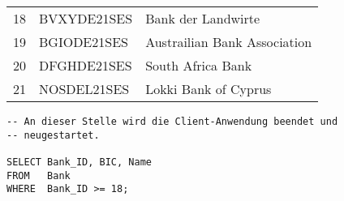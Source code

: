           \begin{center}
            \begin{small}
              \tablehead{}
              \tabletail {
              }
              \begin{msoraclesql}
                \begin{supertabular}{rll}
                  18 & BVXYDE21SES & Bank der Landwirte \\
                  19 & BGIODE21SES & Austrailian Bank Association \\
                  20 & DFGHDE21SES & South Africa Bank \\
                  21 & NOSDEL21SES & Lokki Bank of Cyprus  \\
                \end{supertabular}
              \end{msoraclesql}
            \end{small}
          \end{center}
\clearpage
         \begin{lstlisting}[language=oracle_sql,label=sql07_27]
-- An dieser Stelle wird die Client-Anwendung beendet und
-- neugestartet.

SELECT Bank_ID, BIC, Name
FROM   Bank
WHERE  Bank_ID >= 18;
          \end{lstlisting}
